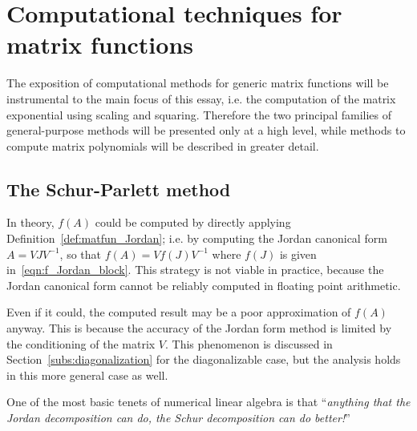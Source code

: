 %	



\section{Computational techniques for matrix functions}
The exposition of computational methods for generic matrix functions will be instrumental 
to the main focus of this essay, i.e. the computation of the matrix exponential using scaling and squaring.
Therefore the two principal families of general-purpose methods will be presented only at a high level,
while methods to compute matrix polynomials will be described in greater detail.

\subsection{The Schur-Parlett method}
In theory, $f(A)$ could be computed by directly applying Definition~\ref{def:matfun_Jordan}; i.e. by computing the Jordan canonical form $A=VJV^{-1}$, so that $f(A)=Vf(J)V^{-1}$ where $f(J)$ is given in~\eqref{eqn:f_Jordan_block}. This strategy is not viable in practice, because the Jordan canonical form cannot be reliably computed in floating point arithmetic.
\begin{oss*}
	Even if it could, the computed result may be a poor approximation of $f(A)$ anyway. This is because the accuracy of the Jordan form method is limited by the conditioning of the matrix $V$. This phenomenon is discussed in Section~\ref{subs:diagonalization} for the diagonalizable case, but the analysis holds in this more general case as well.
\end{oss*}
One of the most basic tenets of numerical linear algebra is that ``\emph{anything that the Jordan decomposition can do, the Schur decomposition can do better!}''~\cite{vanloan:StudyMatrixExponential75}
\smallskip 

